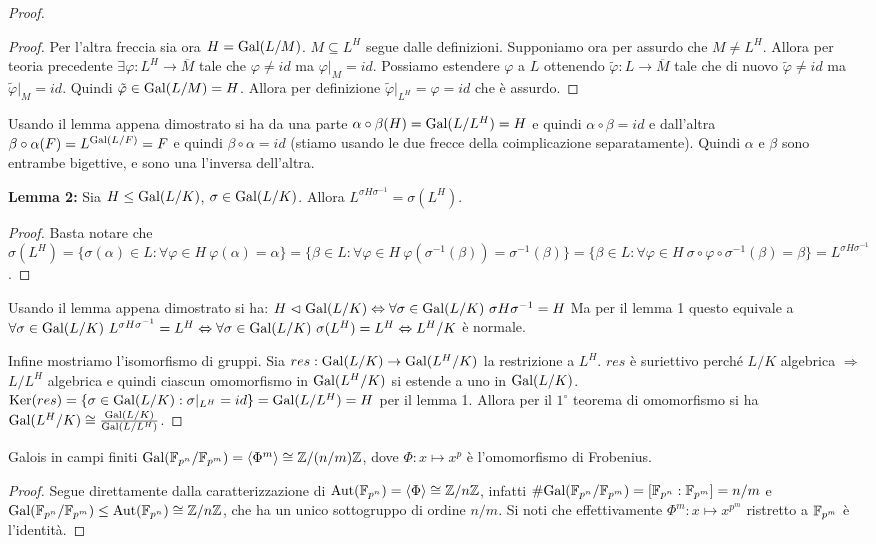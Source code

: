 \begin{proof}
\begin{proof}
        Per l'altra freccia sia ora $H = \text{Gal}(L/M)$. $M \subseteq L^H$ segue dalle definizioni. Supponiamo ora per assurdo che $M \neq L^H$. Allora per teoria precedente $\exists \varphi : L^H \rightarrow \overline{M}$ tale che $\varphi \neq id$ ma $\varphi|_M = id$. Possiamo estendere $\varphi$ a $L$ ottenendo $\tilde \varphi : L \rightarrow \overline{M}$ tale che di nuovo $\tilde \varphi \neq id$ ma $\tilde \varphi|_M = id$. Quindi $\tilde \varphi \in \text{Gal}(L/M) = H$. Allora per definizione $\tilde \varphi|_{L^H} = \varphi  = id$ che è assurdo. 
    \end{proof}
    Usando il lemma appena dimostrato si ha da una parte $\alpha \circ \beta (H) = \text{Gal}(L/L^H) = H$ e quindi $\alpha \circ \beta = id$ e dall'altra $\beta \circ \alpha (F) = L^{\text{Gal}(L/F)} = F$ e quindi $\beta \circ \alpha = id$  (stiamo usando le due frecce della coimplicazione separatamente). Quindi $\alpha$ e $\beta$ sono entrambe bigettive, e sono una l'inversa dell'altra.
    
    \textbf{Lemma 2:} Sia $H \leq \text{Gal}(L/K)$, $\sigma \in \text{Gal}(L/K)$. Allora $L^{\sigma H \sigma^{-1}}=\sigma(L^H)$.
    \begin{proof}
         Basta notare che $\sigma(L^H) = \{ \sigma(\alpha) \in L : \forall \varphi \in H \ \varphi(\alpha) = \alpha\} =  \{ \beta \in L : \forall \varphi \in H \ \varphi(\sigma^{-1}(\beta)) = \sigma^{-1}(\beta)\} = \{ \beta \in L : \forall \varphi \in H \ \sigma \circ \varphi \circ \sigma^{-1}(\beta) = \beta \} = L^{\sigma H \sigma^{-1}}$.
    \end{proof}
    Usando il lemma appena dimostrato si ha: $H \vartriangleleft \text{Gal}(L/K) \Leftrightarrow \forall \sigma \in \text{Gal}(L/K) \ \sigma H \sigma^{-1} = H$ Ma per il lemma 1 questo equivale a $ \forall \sigma \in \text{Gal}(L/K) \ L^{\sigma H \sigma^{-1}}=L^H \Leftrightarrow  \forall \sigma \in \text{Gal}(L/K) \ \sigma(L^H)=L^H \Leftrightarrow L^H/K$ è normale.
    
    Infine mostriamo l'isomorfismo di gruppi. Sia $res : \text{Gal}(L/K) \rightarrow \text{Gal}(L^H/K)$ la restrizione a $L^H$. $res$ è suriettivo perché $L/K$ algebrica $\Rightarrow$ $L/L^H$ algebrica e quindi ciascun omomorfismo in $\text{Gal}(L^H/K)$ si estende a uno in $\text{Gal}(L/K)$. \\ $\text{Ker}(res) = \{ \sigma \in \text{Gal}(L/K) : \sigma|_{L^H} = id\} = \text{Gal}(L/L^H) = H$ per il lemma 1. Allora per il $1^{\circ}$ teorema di omomorfismo si ha $\text{Gal}(L^H/K) \cong \frac{\text{Gal}(L/K)}{\text{Gal}(L/L^H)}$.
\end{proof}

\begin{theorem}{Galois in campi finiti}
    $\text{Gal}(\mathbb{F}_{p^n} / \mathbb{F}_{p^m}) = \langle \Phi^m \rangle \cong \mathbb{Z}/(n/m)\mathbb{Z}$, dove $\Phi : x \mapsto x^p$ è l'omomorfismo di Frobenius.
\end{theorem}
\begin{proof}
    Segue direttamente dalla caratterizzazione di $\text{Aut}(\mathbb{F}_{p^n}) = \langle \Phi \rangle \cong \mathbb{Z}/n\mathbb{Z}$, infatti $\#\text{Gal}(\mathbb{F}_{p^n} / \mathbb{F}_{p^m}) = [\mathbb{F}_{p^n} : \mathbb{F}_{p^m}] = n / m$ e $\text{Gal}(\mathbb{F}_{p^n} / \mathbb{F}_{p^m}) \le \text{Aut}(\mathbb{F}_{p^n}) \cong \mathbb{Z}/n\mathbb{Z}$, che ha un unico sottogruppo di ordine $n / m$. Si noti che effettivamente $\Phi^m : x \mapsto x^{p^m}$ ristretto a $\mathbb{F}_{p^m}$ è l'identità.
\end{proof}

